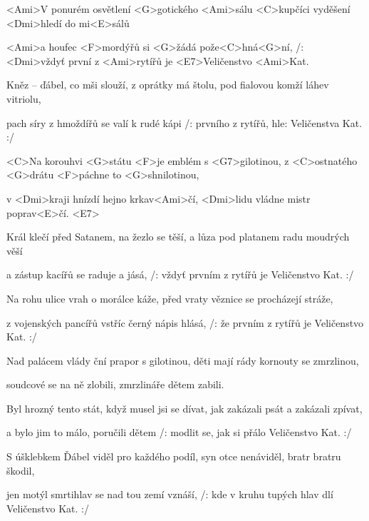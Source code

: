 


\zs
<Ami>V ponurém osvětlení <G>gotického <Ami>sálu
<C>kupčíci vyděšení <Dmi>hledí do mi<E>sálů

<Ami>a houfec <F>mordýřů si <G>žádá pože<C>hná<G>ní,
/: <Dmi>vždyť první z <Ami>rytířů je <E7>Veličenstvo <Ami>Kat.\rlap{ :/}
\ks

\zs
Kněz -- ďábel, co mši slouží, z oprátky má štolu,
pod fialovou komží láhev vitriolu,

pach síry z hmoždířů se valí k rudé kápi
/: prvního z rytířů, hle: Veličenstva Kat. :/
\ks

\zr
<C>Na korouhvi <G>státu <F>je emblém s <G7>gilotinou,
z <C>ostnatého <G>drátu <F>páchne to <G>shnilotinou,

v <Dmi>kraji hnízdí hejno krkav<Ami>čí,
<Dmi>lidu vládne mistr poprav<E>čí. <E7>
\kr

\zs
Král klečí před Satanem, na žezlo se těší,
a lůza pod platanem radu moudrých věší

a zástup kacířů se raduje a jásá,
/: vždyť prvním z rytířů je Veličenstvo Kat. :/
\ks

\zs
Na rohu ulice vrah o morálce káže,
před vraty věznice se procházejí stráže,

z vojenských pancířů vstříc černý nápis hlásá,
/: že prvním z rytířů je Veličenstvo Kat. :/
\ks

\zr
Nad palácem vlády ční prapor s gilotinou,
děti mají rády kornouty se zmrzlinou,

soudcové se na ně zlobili,
zmrzlináře dětem zabili.
\kr

\zs
Byl hrozný tento stát, když musel jsi se dívat,
jak zakázali psát a zakázali zpívat,

a bylo jim to málo, poručili dětem
/: modlit se, jak si přálo Veličenstvo Kat. :/
\ks

\zs
S úšklebkem Ďábel viděl pro každého podíl,
syn otce nenáviděl, bratr bratru škodil,

jen motýl smrtihlav se nad tou zemí vznáší,
/: kde v kruhu tupých hlav dlí Veličenstvo Kat. :/
\ks

\kp
